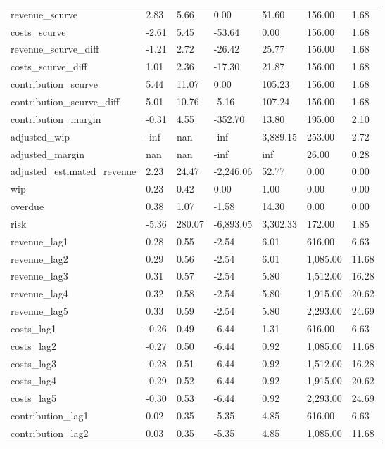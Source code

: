 \begin{landscape}
\begin{longtable}[h!]{lllllll}
revenue_scurve & 2.83 & 5.66 & 0.00 & 51.60 & 156.00 & 1.68 \\
costs_scurve & -2.61 & 5.45 & -53.64 & 0.00 & 156.00 & 1.68 \\
revenue_scurve_diff & -1.21 & 2.72 & -26.42 & 25.77 & 156.00 & 1.68 \\
costs_scurve_diff & 1.01 & 2.36 & -17.30 & 21.87 & 156.00 & 1.68 \\
contribution_scurve & 5.44 & 11.07 & 0.00 & 105.23 & 156.00 & 1.68 \\
contribution_scurve_diff & 5.01 & 10.76 & -5.16 & 107.24 & 156.00 & 1.68 \\
contribution_margin & -0.31 & 4.55 & -352.70 & 13.80 & 195.00 & 2.10 \\
adjusted_wip & -inf & nan & -inf & 3,889.15 & 253.00 & 2.72 \\
adjusted_margin & nan & nan & -inf & inf & 26.00 & 0.28 \\
adjusted_estimated_revenue & 2.23 & 24.47 & -2,246.06 & 52.77 & 0.00 & 0.00 \\
wip & 0.23 & 0.42 & 0.00 & 1.00 & 0.00 & 0.00 \\
overdue & 0.38 & 1.07 & -1.58 & 14.30 & 0.00 & 0.00 \\
risk & -5.36 & 280.07 & -6,893.05 & 3,302.33 & 172.00 & 1.85 \\
revenue_lag1 & 0.28 & 0.55 & -2.54 & 6.01 & 616.00 & 6.63 \\
revenue_lag2 & 0.29 & 0.56 & -2.54 & 6.01 & 1,085.00 & 11.68 \\
revenue_lag3 & 0.31 & 0.57 & -2.54 & 5.80 & 1,512.00 & 16.28 \\
revenue_lag4 & 0.32 & 0.58 & -2.54 & 5.80 & 1,915.00 & 20.62 \\
revenue_lag5 & 0.33 & 0.59 & -2.54 & 5.80 & 2,293.00 & 24.69 \\
costs_lag1 & -0.26 & 0.49 & -6.44 & 1.31 & 616.00 & 6.63 \\
costs_lag2 & -0.27 & 0.50 & -6.44 & 0.92 & 1,085.00 & 11.68 \\
costs_lag3 & -0.28 & 0.51 & -6.44 & 0.92 & 1,512.00 & 16.28 \\
costs_lag4 & -0.29 & 0.52 & -6.44 & 0.92 & 1,915.00 & 20.62 \\
costs_lag5 & -0.30 & 0.53 & -6.44 & 0.92 & 2,293.00 & 24.69 \\
contribution_lag1 & 0.02 & 0.35 & -5.35 & 4.85 & 616.00 & 6.63 \\
contribution_lag2 & 0.03 & 0.35 & -5.35 & 4.85 & 1,085.00 & 11.68 \\

\end{longtable}
\end{landscape}
